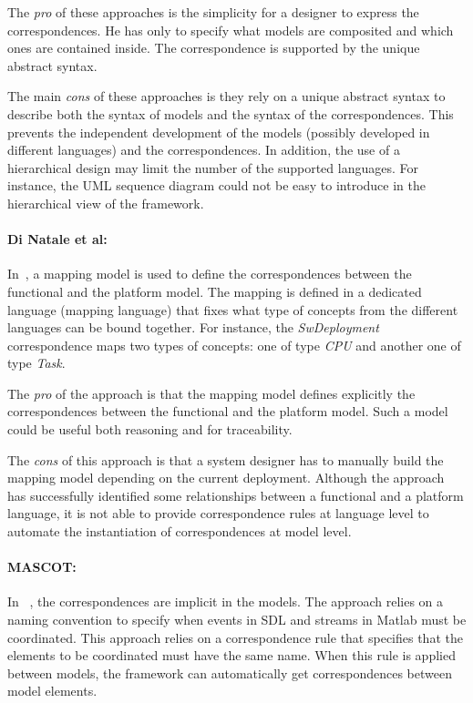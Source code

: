 The \emph{pro} of these approaches is the simplicity for a designer to express the correspondences. He has only to specify what models are composited and which ones are contained inside. The correspondence is supported by the unique abstract syntax. 

The main \emph{cons} of these approaches is they rely on a unique abstract syntax to describe both the syntax of models and the syntax of the correspondences. This prevents the independent development of the models (possibly developed in different languages) and the correspondences. In addition, the use of a hierarchical design may limit the number of the supported languages. For instance, the UML sequence diagram could not be easy to introduce in the hierarchical view of the framework.

\paragraph{Di Natale et al: }
In~\cite{dinatale}, a mapping model is used to define the correspondences between the functional and the platform model. The mapping is defined in a dedicated language (\ie mapping language) that fixes what type of concepts from the different languages can be bound together. For instance, the \emph{SwDeployment} correspondence maps two types of concepts: one of type \emph{CPU} and another one of type \emph{Task}. 

The \emph{pro} of the approach is that the mapping model defines explicitly the correspondences between the functional and the platform model. Such a model could be useful both reasoning and for traceability. 

The \emph{cons} of this approach is that a system designer has to manually build the mapping model depending on the current deployment. Although the approach has successfully identified some relationships between a functional and a platform language, it is not able to provide correspondence rules at language level to automate the instantiation of correspondences at model level. 

\paragraph{MASCOT: }
In ~\cite{mascotbib}, the correspondences are implicit in the models. The approach relies on a naming convention to specify when events in SDL and streams in Matlab must be coordinated. This approach relies on a correspondence rule that specifies that the elements to be coordinated must have the same name. When this rule is applied between models, the framework can automatically get correspondences between model elements.

